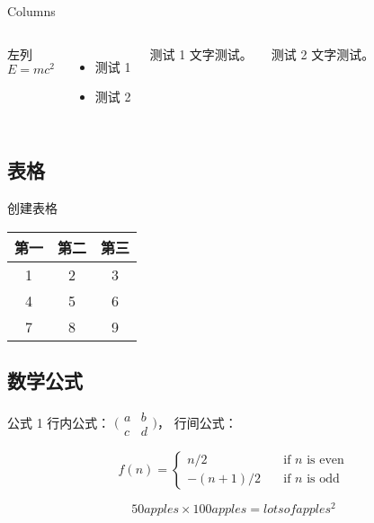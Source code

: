 \begin{frame}{Columns}
    \begin{columns}
        左列
        $$E=mc^2$$
        \begin{itemize}
        \item 测试 1
        \item 测试 2
        \end{itemize}
        
        \begin{block}{测试 1}
            文字测试。
        \end{block}
        \begin{block}{测试 2}
            文字测试。
        \end{block}
        
    \end{columns}
\end{frame}

\subsection{表格}

\begin{frame}{创建表格}
    \begin{center}
        \begin{table}[!t]  
            \begin{tabular}{ccc}  
                \toprule   
                第一&第二&第三\\ 
                \midrule       
                1 & 2 & 3 \\ 
                4 & 5 & 6 \\ 
                7 & 8 & 9 \\
                \bottomrule  
            \end{tabular}
        \end{table}
    \end{center}
\end{frame}

\subsection{数学公式}

\begin{frame}{公式 1}
    行内公式：
    $\bigl(\begin{smallmatrix}
    a&b \\ c&d
    \end{smallmatrix} \bigr)$，
    行间公式：

    \[ f(n) =
    \begin{cases}
        n/2       & \quad \text{if } n \text{ is even}\\
        -(n+1)/2  & \quad \text{if } n \text{ is odd}
    \end{cases}
    \]

    $$50 apples \times 100 apples = lots of apples^2$$
\end{frame}

